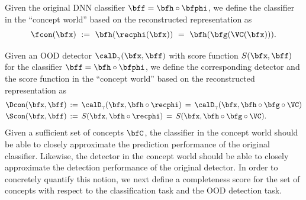 Given the original DNN classifier $\bff = \bfh \circ \bfphi$, we define the classifier in the ``concept world'' based on the reconstructed representation as
\begin{equation}
\label{equ:classifier_concept}
\fcon(\bfx) ~:=~ \bfh(\recphi(\bfx)) ~=~ \bfh(\bfg(\VC(\bfx))).
\end{equation}

Given an OOD detector $\calD_\gamma(\bfx, \bff)$ with score function $S(\bfx, \bff)$ for the classifier $\bff = \bfh \circ \bfphi$, we define the corresponding detector and the score function in the ``concept world'' based on the reconstructed representation as
\begin{align}
\label{equ:detector_concept}
\Dcon(\bfx, \bff) \,&:=\, \calD_\gamma(\bfx, \bfh \circ \recphi) \,=\, \calD_\gamma(\bfx, \bfh \circ \bfg \circ \VC) \nonumber \\
\Scon(\bfx, \bff) \,&:=\, S(\bfx, \bfh \circ \recphi) \,=\, S(\bfx, \bfh \circ \bfg \circ \VC).
\end{align}
Given a sufficient set of concepts $\bfC$, the classifier in the concept world should be able to closely approximate the prediction performance of the original classifier.
Likewise, the detector in the concept world should be able to closely approximate the detection performance of the original detector.
In order to concretely quantify this notion, we next define a 
completeness score for the set of concepts with respect to the classification task and the OOD detection task.



